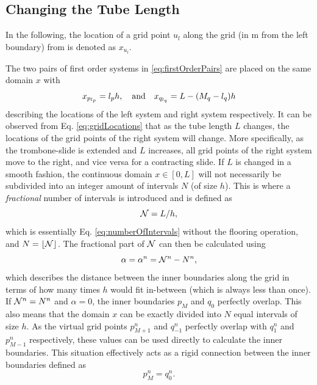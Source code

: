 \subsection{Changing the Tube Length}
In the following, the location of a grid point $u_l$ along the grid (in m from the left boundary) from is denoted as $x_{u_l}$.

The two pairs of first order systems in \eqref{eq:firstOrderPairs} are placed on the same domain $x$ with
\begin{equation}\label{eq:gridLocations}
    x_{p_{l_p}} = {l_p} h, \quad \text{and}\quad
    x_{q_{l_q}} = L-(M_q - {l_q})h
\end{equation}
describing the locations of the left system and right system respectively. It can be observed from Eq. \eqref{eq:gridLocations} that as the tube length $L$ changes, the locations of the grid points of the right system will change. More specifically, as the trombone-slide is extended and $L$ increases, all grid points of the right system move to the right, and vice versa for a contracting slide. If $L$ is changed in a smooth fashion, the continuous domain $x \in [0,L]$ will not necessarily be subdivided into an integer amount of intervals $N$ (of size $h$). This is where a \textit{fractional} number of intervals is introduced and is defined as 
\begin{equation}\label{eq:nfrac}
    \mathcal{N} = L/h,
\end{equation}
which is essentially Eq. \eqref{eq:numberOfIntervals} without the flooring operation, and $N = \lfloor \mathcal{N} \rfloor$. The fractional part of $\mathcal{N}$ can then be calculated using
\begin{equation}\label{eq:alphaDef}
    \alpha = \alpha^n = \mathcal{N}^n - N^n,
\end{equation}
which describes the distance between the inner boundaries along the grid in terms of how many times $h$ would fit in-between (which is always less than once). If $\mathcal{N}^n = N^n$ and $\alpha = 0$, the inner boundaries $p_M$ and $q_0$ perfectly overlap. This also means that the domain $x$ can be exactly divided into $N$ equal intervals of size $h$. As the virtual grid points $p_{M+1}^n$ and $q_{-1}^n$ perfectly overlap with $q_{1}^n$ and $p_{M-1}^n$ respectively, these values can be used directly to calculate the inner boundaries. This situation effectively acts as a rigid connection between the inner boundaries defined as
\begin{equation}\label{eq:rigidConn}
    p_M^n = q_0^n.
\end{equation}
